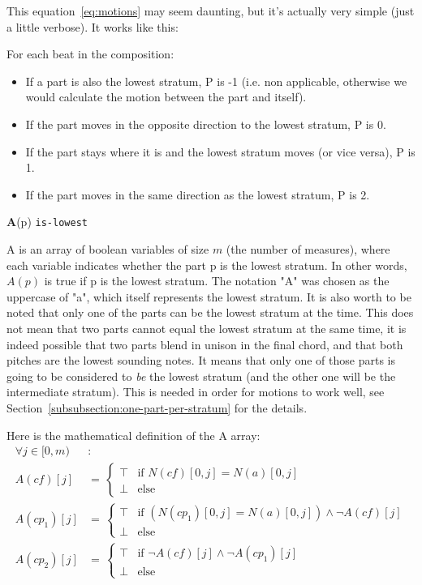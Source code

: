 This equation~\ref{eq:motions} may seem daunting, but it's actually very simple (just a little verbose).
It works like this: 

For each beat in the composition:
\begin{itemize}
    \item If a part is also the lowest stratum, P is -1 (i.e. non applicable, otherwise we would calculate the motion between the part and itself).
    \item If the part moves in the opposite direction to the lowest stratum, P is 0.
    \item If the part stays where it is and the lowest stratum moves (or vice versa), P is 1.
    \item If the part moves in the same direction as the lowest stratum, P is 2.
\end{itemize}

\vspace{.5cm} \noindent \textbf{A}(p) \hspace{.cm} \texttt{is-lowest} \label{is-lowest}

A is an array of boolean variables of size $m$ (the number of measures), where each variable indicates whether the part p is the lowest stratum. In other words, $A(p)$ is true if p is the lowest stratum. The notation "A" was chosen as the uppercase of "a", which itself represents the lowest stratum. 
It is also worth to be noted that only one of the parts can be the lowest stratum at the time. This does not mean that two parts cannot equal the lowest stratum at the same time, it is indeed possible that two parts blend in unison in the final chord, and that both pitches are the lowest sounding notes. It means that only one of those parts is going to be considered to \textit{be} the lowest stratum (and the other one will be the intermediate stratum). This is needed in order for motions to work well, see Section~\ref{subsubsection:one-part-per-stratum} for the details.

Here is the mathematical definition of the A array:
\begin{equation}
\begin{aligned}
\forall j \in [0, m)& \colon  \\
A(\mathit{cf})[j] &= \,  
\begin{cases}
    \top & \text{if } N(cf)[0,j] = N(a)[0,j] \\
    \bot & \text{else }
\end{cases}\\
A(cp_1)[j] &= \,  
\begin{cases}
    \top & \text{if } (N(cp_1)[0,j] = N(a)[0,j]) \land \neg A(\mathit{cf})[j] \\
    \bot & \text{else }
\end{cases}\\
A(cp_2)[j] &= \,  
\begin{cases}
    \top & \text{if } \neg A(\mathit{cf})[j] \land \neg A(cp_1)[j]\\
    \bot & \text{else }
\end{cases}
\end{aligned}
\end{equation}

